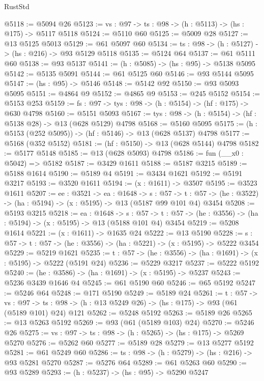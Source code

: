 \begin{lexlean}{RustStd}
\begin{coremodule}
@5118 := @5094 @26
@5123 := {vs : @97} -> {ts : @98} -> (h : @5113) -> (hs : @175) -> @5117 @5118
@5124 := @5110 @60
@5125 := @5009 @28
@5127 := @13 @5125 @5013
@5129 := @61 @5097 @60
@5134 := {ts : @98} -> (h : @5127) -> (hs : @216) -> @93 @5129 @5118
@5135 := @5124 @64
@5137 := @61 @5111 @60
@5138 := @93 @5137
@5141 := (h : @5085) -> (hs : @95) -> @5138 @5095
@5142 := @5135 @5091
@5144 := @61 @5125 @60
@5146 := @93 @5144 @5095
@5147 := (hs : @95) -> @5146
@5148 := @5142 @92
@5150 := @93 @5093 @5095
@5151 := @4864 @9
@5152 := @4865 @9
@5153 := @245 @5152
@5154 := @5153 @253
@5159 := {fs : @97} -> {tys : @98} -> (h : @5154) -> (hf : @175) -> @630 @4798
@5160 := @5151 @5093
@5167 := {tys : @98} -> (h : @5154) -> (hf : @5138 @28) -> @13 (@628 @5129) @4798
@5168 := @5160 @5095
@5175 := (h : @5153 (@252 @5095)) -> (hf : @5146) -> @13 (@628 @5137) @4798
@5177 := @5168 (@352 @5152)
@5181 := (hf : @5150) -> @13 (@628 @5144) @4798
@5182 := @5177 @5148
@5185 := @13 (@628 @5093) @4798
@5186 := fun (__x0 : @5042) => @5182
@5187 := @3429 @1611
@5188 := @5187 @3215
@5189 := @5188 @1614
@5190 := @5189 @4
@5191 := @3434 @1621
@5192 := @5191 @3217
@5193 := @3520 @1611
@5194 := (x : @1611) -> @3507
@5195 := @3523 @1611
@5207 := {ee : @3521} ->
  {ea : @1648} ->
  {s : @57} ->
  {t : @57} -> (he : @3522) -> (ha : @5194) -> (x : @5195) -> @13 (@5187 @99 @101 @4) @3454
@5208 := @5193 @3215
@5218 := {ea : @1648} ->
  {s : @57} -> {t : @57} -> (he : @3556) -> (ha : @5194) -> (x : @5195) -> @13 (@5188 @101 @4) @3454
@5219 := @5208 @1614
@5221 := (x : @1611) -> @1635 @24
@5222 := @13 @5190
@5228 := {s : @57} -> {t : @57} -> (he : @3556) -> (ha : @5221) -> (x : @5195) -> @5222 @3454
@5229 := @5219 @1621
@5235 := {t : @57} -> (he : @3556) -> (ha : @1691) -> (x : @5195) -> @5222 (@5191 @24)
@5236 := @5229 @3217
@5237 := @5222 @5192
@5240 := (he : @3586) -> (ha : @1691) -> (x : @5195) -> @5237
@5243 := @5236 @3439 @1646 @4
@5245 := @61 @5190 @60
@5246 := @65 @5192
@5247 := @5246 @64
@5248 := @171 @5190
@5249 := @5189 @24
@5261 := {t : @57} ->
  {vs : @97} -> {ts : @98} -> (h : @13 @5249 @26) -> (hs : @175) -> @93 (@61 (@5189 @101) @24) @121
@5262 := @5248 @5192
@5263 := @5189 @26
@5265 := @13 @5263 @5192
@5269 := @93 (@61 (@5189 @103) @24)
@5270 := @5246 @26
@5275 := {vs : @97} -> {ts : @98} -> (h : @5265) -> (hs : @175) -> @5269 @5270
@5276 := @5262 @60
@5277 := @5189 @28
@5279 := @13 @5277 @5192
@5281 := @61 @5249 @60
@5286 := {ts : @98} -> (h : @5279) -> (hs : @216) -> @93 @5281 @5270
@5287 := @5276 @64
@5289 := @61 @5263 @60
@5290 := @93 @5289
@5293 := (h : @5237) -> (hs : @95) -> @5290 @5247

\end{coremodule}
\end{lexlean}
